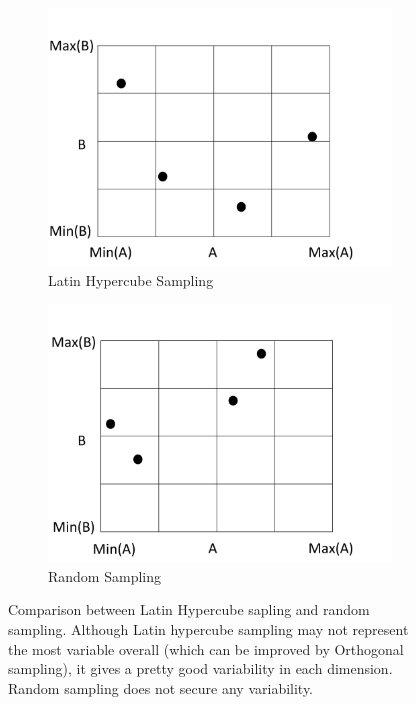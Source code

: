 \documentclass[14pt]{report}
\numberwithin{equation}{chapter}
\begin{document}
\begin{spacing}{2}
\begin{figure}
\begin{subfigure}{0.5\textwidth}
\centering
\includegraphics[scale = 0.3]{LHS.pdf}
\caption{Latin Hypercube Sampling}
\end{subfigure}
\hspace*{0.02\textwidth}
\begin{subfigure}{0.5\textwidth}
\centering
\includegraphics[scale = 0.3]{RS.pdf}
\caption{Random Sampling}
\end{subfigure}
\caption{Comparison between Latin Hypercube sapling and random sampling. Although Latin hypercube sampling may not represent the most variable overall (which can be improved by Orthogonal sampling), it gives a pretty good variability in each dimension. Random sampling does not secure any variability. }
\end{figure}




\end{spacing}
\end{document}
